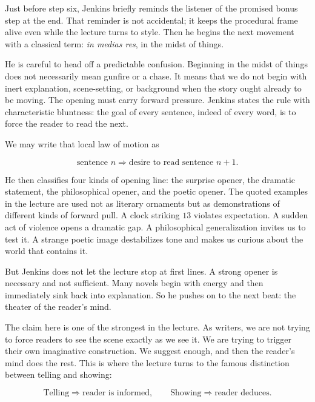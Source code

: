Just before step six, Jenkins briefly reminds the listener of the promised bonus step at the end. That reminder is not accidental; it keeps the procedural frame alive even while the lecture turns to style. Then he begins the next movement with a classical term: \emph{in medias res}, in the midst of things.

He is careful to head off a predictable confusion. Beginning in the midst of things does not necessarily mean gunfire or a chase. It means that we do not begin with inert explanation, scene-setting, or background when the story ought already to be moving. The opening must carry forward pressure. Jenkins states the rule with characteristic bluntness: the goal of every sentence, indeed of every word, is to force the reader to read the next.

We may write that local law of motion as

\begin{equation}
\text{sentence } n \Rightarrow \text{desire to read sentence } n+1.
\end{equation}

He then classifies four kinds of opening line: the surprise opener, the dramatic statement, the philosophical opener, and the poetic opener. The quoted examples in the lecture are used not as literary ornaments but as demonstrations of different kinds of forward pull. A clock striking \(13\) violates expectation. A sudden act of violence opens a dramatic gap. A philosophical generalization invites us to test it. A strange poetic image destabilizes tone and makes us curious about the world that contains it.

But Jenkins does not let the lecture stop at first lines. A strong opener is necessary and not sufficient. Many novels begin with energy and then immediately sink back into explanation. So he pushes on to the next beat: the theater of the reader's mind.

The claim here is one of the strongest in the lecture. As writers, we are not trying to force readers to see the scene exactly as we see it. We are trying to trigger their own imaginative construction. We suggest enough, and then the reader's mind does the rest. This is where the lecture turns to the famous distinction between telling and showing:

\begin{equation}
\text{Telling} \Rightarrow \text{reader is informed},\qquad
\text{Showing} \Rightarrow \text{reader deduces}.
\end{equation}

